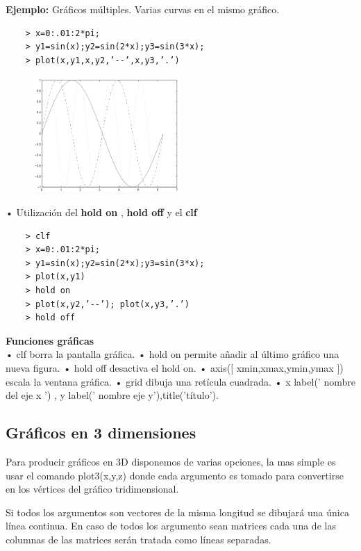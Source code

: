 \documentclass[a4,12pt]{article}
\begin{document}
\textbf{Ejemplo:} Gráficos múltiples. Varias curvas en el mismo gráfico.\\
\begin{verbatim}
    > x=0:.01:2*pi;
    > y1=sin(x);y2=sin(2*x);y3=sin(3*x);
    > plot(x,y1,x,y2,’--’,x,y3,’.’)
\end{verbatim}

\begin{figure}[H]
  \centering
    \includegraphics[width=0.5\textwidth]{graficos/imagen7}
\end{figure}

• Utilización del \textbf{hold on} , \textbf{hold off} y el \textbf{clf}\\
\begin{verbatim}
    > clf
    > x=0:.01:2*pi;
    > y1=sin(x);y2=sin(2*x);y3=sin(3*x);
    > plot(x,y1)
    > hold on
    > plot(x,y2,’--’); plot(x,y3,’.’)
    > hold off
\end{verbatim}
\textbf{Funciones gráficas}\\
\smallskip
• clf borra la pantalla gráfica.
• hold on permite añadir al último gráfico una nueva figura.
• hold off desactiva el hold on.
• axis([ xmin,xmax,ymin,ymax ]) escala la ventana gráfica.
• grid dibuja una retícula cuadrada.
• x label(’ nombre del eje x ’) , y label(’ nombre eje y’),title(’título’).

\subsection{Gráficos en 3 dimensiones}

Para producir gráficos en 3D disponemos de varias opciones, la mas simple es usar el comando  plot3(x,y,z) donde cada argumento es tomado para convertirse en los vértices del gráfico tridimensional.

Si todos los argumentos son vectores de la misma longitud se dibujará una única línea continua. En caso de todos los argumento sean matrices cada una de las columnas de las matrices serán tratada como líneas separadas.
\end{document}

